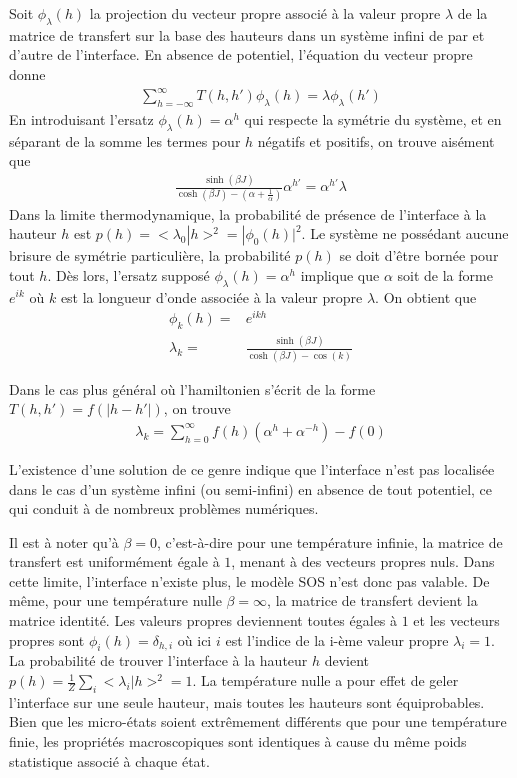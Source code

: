 	Soit $\phi_\lambda(h)$ la projection du vecteur propre associé à la valeur propre $\lambda$ de la matrice de transfert sur la base des hauteurs dans un système infini de par et d'autre de l'interface. En absence de potentiel\cite{guyer1979}, l'équation du vecteur propre donne
\begin{align}
	\sum_{h=-\infty}^\infty T(h,h') \phi_\lambda(h) = \lambda \phi_\lambda(h')
\end{align}
En introduisant l'ersatz $\phi_\lambda(h) = \alpha^h$ qui respecte la symétrie du système, et en séparant de la somme les termes pour $h$ négatifs et positifs, on trouve aisément que 
\begin{align}
	\frac{\sinh(\beta J)}{\cosh(\beta J)-(\alpha+\frac{1}{\alpha})} \alpha^{h'} = \alpha^{h'} \lambda
\end{align}
Dans la limite thermodynamique, la probabilité de présence de l'interface à la hauteur $h$ est $p(h) = <\lambda_0|h>^2 = |\phi_0(h)|^2$. Le système ne possédant aucune brisure de symétrie particulière, la probabilité $p(h)$ se doit d'être bornée pour tout $h$. Dès lors, l'ersatz supposé $\phi_\lambda(h) = \alpha^h$ implique que $\alpha$ soit de la forme $e^{ik}$ où $k$ est la longueur d'onde associée à la valeur propre $\lambda$. On obtient que 
\begin{align}
	\phi_k(h) =& e^{ikh} \\
	\lambda_k =& \frac{\sinh(\beta J)}{\cosh(\beta J) - \cos(k)}
\end{align}


Dans le cas plus général où l'hamiltonien s'écrit de la forme $T(h,h') = f(|h-h'|)$, on trouve 
\begin{align}
	\lambda_k = \sum_{h=0}^\infty f(h)(\alpha^h+\alpha^{-h}) - f(0)
\end{align}

L'existence d'une solution de ce genre indique que l'interface n'est pas localisée dans le cas d'un système infini (ou semi-infini) en absence de tout potentiel, ce qui conduit à de nombreux problèmes numériques. 

Il est à noter qu'à $\beta=0$, c'est-à-dire pour une température infinie, la matrice de transfert est uniformément égale à $1$, menant à des vecteurs propres nuls. Dans cette limite, l'interface n'existe plus, le modèle SOS n'est donc pas valable. De même, pour une température nulle $\beta=\infty$, la matrice de transfert devient la matrice identité. Les valeurs propres deviennent toutes égales à $1$ et les vecteurs propres sont $\phi_i(h) = \delta_{h,i}$ où ici $i$ est l'indice de la i-ème valeur propre $\lambda_i = 1$. La probabilité de trouver l'interface à la hauteur $h$ devient $p(h) = \frac{1}{Z}\sum_{i} <\lambda_i | h >^2 = 1$. La température nulle a pour effet de geler l'interface sur une seule hauteur, mais toutes les hauteurs sont équiprobables. Bien que les micro-états soient extrêmement différents que pour une température finie, les propriétés macroscopiques sont identiques à cause du même poids statistique associé à chaque état.


